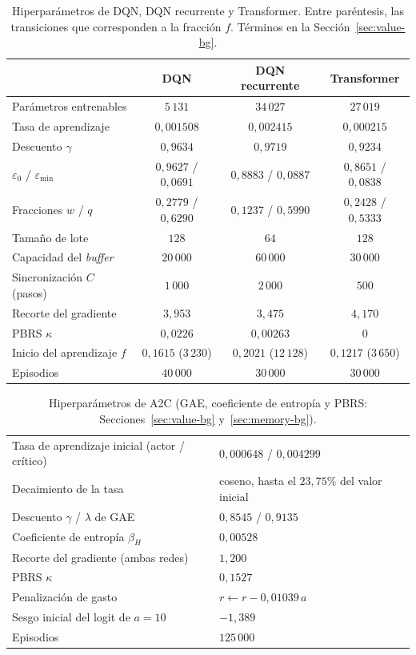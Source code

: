 \documentclass[../00_Main/Main.tex]{subfiles}
\begin{document}
\begin{table}[H]
\centering
\caption[Hiperpar\'ametros de los modelos de tipo DQN]{Hiperpar\'ametros
de DQN, DQN recurrente y Transformer. Entre par\'entesis, las
transiciones que corresponden a la fracci\'on $f$. T\'erminos en la
Secci\'on~\ref{sec:value-bg}.}
\label{tab:deep-hparams}
\small
\begin{tabular}{@{}lccc@{}}
\toprule
 & \textbf{DQN} & \textbf{DQN recurrente} & \textbf{Transformer} \\
\midrule
Par\'ametros entrenables & $5\,131$ & $34\,027$ & $27\,019$ \\
Tasa de aprendizaje & $0{,}001508$ & $0{,}002415$ & $0{,}000215$ \\
Descuento $\gamma$ & $0{,}9634$ & $0{,}9719$ & $0{,}9234$ \\
$\varepsilon_0$ / $\varepsilon_{\min}$ & $0{,}9627$ / $0{,}0691$ & $0{,}8883$ / $0{,}0887$ & $0{,}8651$ / $0{,}0838$ \\
Fracciones $w$ / $q$ & $0{,}2779$ / $0{,}6290$ & $0{,}1237$ / $0{,}5990$ & $0{,}2428$ / $0{,}5333$ \\
Tama\~no de lote & $128$ & $64$ & $128$ \\
Capacidad del \emph{buffer} & $20\,000$ & $60\,000$ & $30\,000$ \\
Sincronizaci\'on $C$ (pasos) & $1\,000$ & $2\,000$ & $500$ \\
Recorte del gradiente & $3{,}953$ & $3{,}475$ & $4{,}170$ \\
PBRS $\kappa$ & $0{,}0226$ & $0{,}00263$ & $0$ \\
Inicio del aprendizaje $f$ & $0{,}1615$ ($3\,230$) & $0{,}2021$ ($12\,128$) & $0{,}1217$ ($3\,650$) \\
Episodios & $40\,000$ & $30\,000$ & $30\,000$ \\
\bottomrule
\end{tabular}
\end{table}

\begin{table}[H]
\centering
\caption[Hiperpar\'ametros de A2C]{Hiperpar\'ametros de A2C (GAE,
coeficiente de entrop\'ia y PBRS: Secciones~\ref{sec:value-bg}
y~\ref{sec:memory-bg}).}
\label{tab:a2c-hparams}
\small
\begin{tabular}{@{}ll@{}}
\toprule
Tasa de aprendizaje inicial (actor / cr\'itico) & $0{,}000648$ / $0{,}004299$ \\
Decaimiento de la tasa & coseno, hasta el $23{,}75\%$ del valor inicial \\
Descuento $\gamma$ / $\lambda$ de GAE & $0{,}8545$ / $0{,}9135$ \\
Coeficiente de entrop\'ia $\beta_H$ & $0{,}00528$ \\
Recorte del gradiente (ambas redes) & $1{,}200$ \\
PBRS $\kappa$ & $0{,}1527$ \\
Penalizaci\'on de gasto & $r \leftarrow r - 0{,}01039\,a$ \\
Sesgo inicial del logit de $a = 10$ & $-1{,}389$ \\
Episodios & $125\,000$ \\
\bottomrule
\end{tabular}
\end{table}
\end{document}
